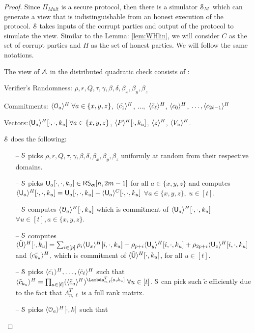 \begin{proof}
	Since $\Pi_{Mult}$ is a secure protocol, then there is a simulator $\mathcal{S}_{M}$ which can generate a view that is indistinguishable from an honest execution of the protocol. $\mathcal{S}$ takes inputs of the corrupt parties and output of the protocol to simulate the view. Similar to the Lemma: \ref{lem:WHlin}, we will consider $C$ as the set of corrupt parties and $H$ as the set of honest parties. We will follow the same notations. 
	
	The view of $\mathcal{A}$ in the distributed quadratic check consists of :
	
	Verifier's Randomness: $\rho, r, Q, \tau, \gamma, \beta, \delta, \beta_x, \beta_y, \beta_z$
	
	Commitments: $\langle{\mathcal{O}_a}\rangle^H\; \forall a\in \{x,y,z\}$, $\langle{\tilde{c_1}}\rangle^H$, $\ldots,$ $\langle{\tilde{c}_{\ell}}\rangle^H$, $\langle{c_0}\rangle^H$, $\ldots, \langle{c_{2\ell-1}}\rangle^H$
	
	Vectors:$\langle{\mathsf{U}_a}\rangle^H[\cdot,\cdot,k_u] \; \forall a\in\{x,y,z\}$, $ \langle{P}\rangle^H[\cdot,k_u]$, $\langle{z}\rangle^H$, $\langle{V_u}\rangle^H$.
	
	$\mathcal{S}$ does the following:
	\begin{itemize}
		\item[--] $\mathcal{S}$ picks $\rho, r, Q, \tau, \gamma, \beta, \delta, \beta_x, \beta_y, \beta_z$ uniformly at random from their respective domains.
		\item[--] $\mathcal{S}$ picks $\mathsf{U}_a[\cdot,\cdot, k_u]\in \mathsf{RS}_{\bm{\alpha}}[h,2m-1]$ for all $a\in\{x,y,z\}$  and computes $\langle{\mathsf{U}_a}\rangle^H[\cdot,\cdot,k_u]= \mathsf{U}_a[\cdot, \cdot, k_u] - \langle{\mathsf{U}_a}\rangle^C[\cdot, \cdot, k_u]$ $\forall a\in\{x,y,z\},\; u\in[t]$.
		\item[--] $\mathcal{S}$ computes $\langle{\mathcal{O}_a}\rangle^H[\cdot,k_u]$ which is commitment of $\langle{\mathsf{U}_a}\rangle^H[\cdot, \cdot,k_u]$ $\forall u\in[t], a\in\{x,y,z\}$.
		\item[--] $\mathcal{S}$ computes $\langle{\tilde{\mathsf{U}}}\rangle^H[\cdot,k_u]=\sum_{i\in[p]} \rho_i \langle{\mathsf{U}_x}\rangle^H[i,\cdot,k_u]+ \rho_{p+i} \langle{\mathsf{U}_y}\rangle^H[i,\cdot,k_u]+ \rho_{2p+i} \langle{\mathsf{U}_z}\rangle^H[i,\cdot,k_u]$ and $\langle{\tilde{c_{k_u}}}\rangle^H$, which is commitment of $\langle{\tilde{\mathsf{U}}}\rangle^H[\cdot,k_u]$, for all $u\in [t]$.
		\item[--] $\mathcal{S}$ picks $\langle{\tilde{c_1}}\rangle^H, \ldots, \langle{\tilde{c}_{\ell}}\rangle^H$ such that 
		$\honshr{\tilde{c}_{k_u}} = \prod_{a\in[\ell]} (\honshr{\tilde{c}_{a}})^{\Lambda_{n,\ell}^T[a,k_u]} \; \forall u\in[t]$.
		$\mathcal{S}$ can pick such $\tilde{c}$ efficiently due to the fact that $\Lambda_{n,\ell}^T$ is a full rank matrix.
		\item[--] $\mathcal{S}$ picks $\langle{\mathcal{O}_a}\rangle^H[\cdot, k]$ such that 
		

\end{itemize}
\end{proof}
